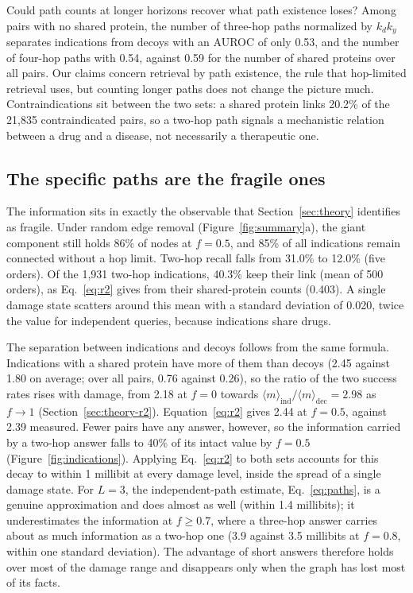 Could path counts at longer horizons recover what path existence loses? Among
pairs with no shared protein, the number of three-hop paths normalized by
$k_dk_y$ separates indications from decoys with an AUROC of only 0.53, and the
number of four-hop paths with 0.54, against 0.59 for the number of shared
proteins over all pairs. Our claims concern retrieval by path existence, the
rule that hop-limited retrieval uses, but counting longer paths does not change
the picture much. Contraindications sit between the two sets: a shared protein
links 20.2\% of the 21,835 contraindicated pairs, so a two-hop path signals a
mechanistic relation between a drug and a disease, not necessarily a
therapeutic one.

\subsection{The specific paths are the fragile ones}
\label{sec:specificity-damage}

The information sits in exactly the observable that Section~\ref{sec:theory}
identifies as fragile. Under random edge removal
(Figure~\ref{fig:summary}a), the giant component
still holds 86\% of nodes at $f=0.5$, and 85\% of all indications remain
connected without a hop limit. Two-hop recall falls from 31.0\% to 12.0\% (five orders). Of
the 1,931 two-hop indications, 40.3\% keep their link (mean of 500 orders), as
Eq.~\eqref{eq:r2} gives from their shared-protein counts (0.403). A single
damage state scatters around this mean with a standard deviation of 0.020,
twice the value for independent queries, because indications share drugs.

The separation between indications and decoys follows from the same formula.
Indications with a shared protein have more of them than decoys (2.45 against
1.80 on average; over all pairs, 0.76 against 0.26), so the ratio of the two success rates rises with damage, from
2.18 at $f=0$ towards $\langle m\rangle_{\mathrm{ind}}/\langle m\rangle_{\mathrm{dec}}=2.98$
as $f\to1$ (Section~\ref{sec:theory-r2}). Equation~\eqref{eq:r2} gives 2.44 at
$f=0.5$, against 2.39 measured. Fewer pairs have any answer, however, so the
information carried by a two-hop answer falls to 40\% of its intact value by
$f=0.5$ (Figure~\ref{fig:indications}). Applying Eq.~\eqref{eq:r2} to both sets
accounts for this decay to within 1 millibit at every damage level, inside the
spread of a single damage state. For $L=3$, the
independent-path estimate, Eq.~\eqref{eq:paths}, is a genuine
approximation and does almost as well (within 1.4 millibits); it underestimates the information at $f\ge0.7$, where a
three-hop answer carries about as much information as a two-hop one (3.9 against
3.5 millibits at $f=0.8$, within one standard deviation). The advantage of short
answers therefore holds over most of the damage range and disappears only when
the graph has lost most of its facts.

